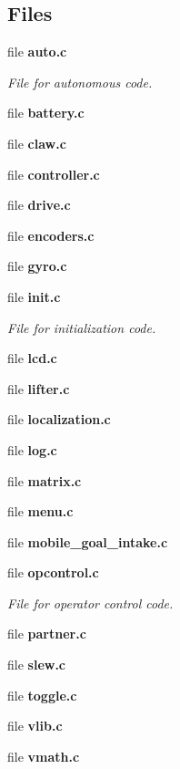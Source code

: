 \subsection*{Files}
\begin{DoxyCompactItemize}
\item 
file \textbf{ auto.\+c}
\begin{DoxyCompactList}\small\item\em File for autonomous code. \end{DoxyCompactList}\item 
file \textbf{ battery.\+c}
\item 
file \textbf{ claw.\+c}
\item 
file \textbf{ controller.\+c}
\item 
file \textbf{ drive.\+c}
\item 
file \textbf{ encoders.\+c}
\item 
file \textbf{ gyro.\+c}
\item 
file \textbf{ init.\+c}
\begin{DoxyCompactList}\small\item\em File for initialization code. \end{DoxyCompactList}\item 
file \textbf{ lcd.\+c}
\item 
file \textbf{ lifter.\+c}
\item 
file \textbf{ localization.\+c}
\item 
file \textbf{ log.\+c}
\item 
file \textbf{ matrix.\+c}
\item 
file \textbf{ menu.\+c}
\item 
file \textbf{ mobile\+\_\+goal\+\_\+intake.\+c}
\item 
file \textbf{ opcontrol.\+c}
\begin{DoxyCompactList}\small\item\em File for operator control code. \end{DoxyCompactList}\item 
file \textbf{ partner.\+c}
\item 
file \textbf{ slew.\+c}
\item 
file \textbf{ toggle.\+c}
\item 
file \textbf{ vlib.\+c}
\item 
file \textbf{ vmath.\+c}
\end{DoxyCompactItemize}
